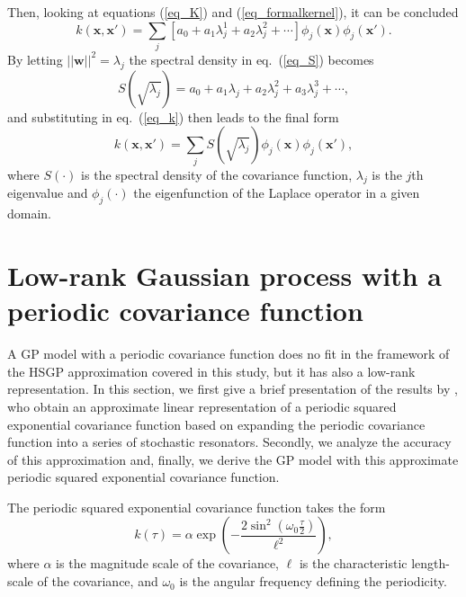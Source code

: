 Then, looking at equations (\ref{eq_K}) and (\ref{eq_formalkernel}), it can be concluded 
%
\begin{equation}\label{eq_k}
k(\bm{x},\bm{x}')= \sum_j [a_0+a_1\lambda_j^1+a_2\lambda_j^2+\cdots] \phi_j(\bm{x}) \phi_j(\bm{x}').
\end{equation} 
By letting $||\bm{w}||^2=\lambda_j$ the spectral density in eq.~(\ref{eq_S}) becomes
%
\begin{equation*}
S(\sqrt{\lambda_j})=a_0+a_1\lambda_j+a_2\lambda_j^2+a_3\lambda_j^3+\cdots,
\end{equation*}
and substituting in eq.~(\ref{eq_k}) then leads to the final form
%
\begin{equation}\label{eq_k_2}
k(\bm{x},\bm{x}')= \sum_j S(\sqrt{\lambda_j}) \phi_j(\bm{x}) \phi_j(\bm{x}'),
\end{equation} 
where $S(\cdot)$ is the spectral density of the covariance function, $\lambda_j$ is the $j$th eigenvalue and $\phi_j(\cdot)$ the eigenfunction of the Laplace operator in a given domain.


\section{Low-rank Gaussian process with a periodic covariance function}\label{sec_periodic}

A GP model with a periodic covariance function does no fit in the framework of the HSGP approximation covered in this study, but it has also a low-rank representation. In this section, we first give a brief presentation of the results by \citet{solin2014explicit}, who obtain an approximate linear representation of a periodic squared exponential covariance function based on expanding the periodic covariance function into a series of stochastic resonators. Secondly, we analyze the accuracy of this approximation and, finally, we derive the GP model with this approximate periodic squared exponential covariance function.

The periodic squared exponential covariance function takes the form
%
\begin{equation} \label{eq_cov_periodic}
k(\tau)= \alpha \exp\left( -\frac{2\sin^{2}(\omega_0\frac{\tau}{2})}{\ell^2}\right),
\end{equation}
where $\alpha$ is the magnitude scale of the covariance, $\ell$ is the characteristic length-scale of the covariance, and $\omega_0$ is the angular frequency defining the periodicity. 


